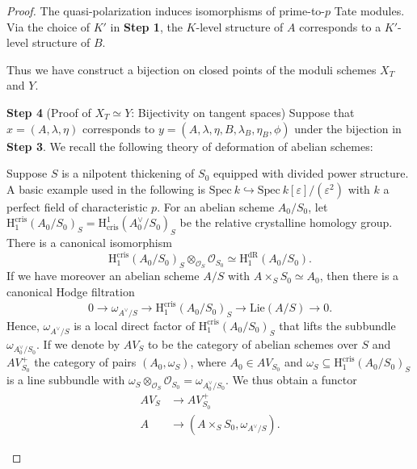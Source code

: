 \documentclass{article}
\begin{document}
\begin{proof}
The quasi-polarization induces isomorphisms of prime-to-$p$ Tate modules. Via the choice of $K'$ in \textbf{Step 1}, the $K$-level structure of $A$ corresponds to a $K'$-level structure of $B$.

Thus we have construct a bijection on closed points of the moduli schemes $X_T$ and $Y$.


\medskip
\noindent\textbf{Step 4} (Proof of $X_T\simeq Y$: Bijectivity on tangent spaces) Suppose that $x=(A,\lambda,\eta)$ corresponds to $y=(A,\lambda,\eta,B,\lambda_B,\eta_B,\phi)$ under the bijection in \textbf{Step 3}. We recall the following theory of deformation of abelian schemes:

Suppose $S$ is a nilpotent thickening of $S_0$ equipped with divided power structure. A basic example used in the following is $\text{Spec}\ k\hookrightarrow \text{Spec}\ k[\varepsilon]/(\varepsilon^2)$ with $k$ a perfect field of characteristic $p$. For an abelian scheme $A_0/S_0$, let $\text{H}^{\text{cris}}_1(A_0/S_0)_S=\text{H}^1_{\text{cris}}(A^\vee_0/S_0)_S$ be the relative crystalline homology group. There is a canonical isomorphism
\begin{equation}
\text{H}_1^{\text{cris}}(A_0/S_0)_S\otimes_{\mathcal{O}_S}\mathcal{O}_{S_0}\simeq \text{H}_1^{\text{dR}}(A_0/S_0).
\end{equation}
If we have moreover an abelian scheme $A/S$ with $A\times_S S_0\simeq A_0$, then there is a canonical Hodge filtration
\begin{equation}
0\longrightarrow \omega_{A^\vee/S}\longrightarrow \text{H}_1^{\text{cris}}(A_0/S_0)_S\longrightarrow \text{Lie}(A/S)\longrightarrow 0.
\end{equation}
Hence, $\omega_{A^\vee/S}$ is a local direct factor of $\text{H}^{\text{cris}}_1(A_0/S_0)_S$ that lifts the subbundle $\omega_{A_0^\vee/S_0}$. If we denote by $AV_S$ to be the category of abelian schemes over $S$ and $AV_{S_0}^+$ the category of pairs $(A_0,\omega_S)$, where $A_0\in AV_{S_0}$ and $\omega_S\subseteq \text{H}_1^{\text{cris}}(A_0/S_0)_S$ is a line subbundle with $\omega_S\otimes_{\mathcal{O}_{S}}\mathcal{O}_{S_0}=\omega_{A_0^\vee/S_0}$. We thus obtain a functor
\begin{equation}
\begin{aligned}
AV_{S}&\longrightarrow AV_{S_0}^+\\
A&\longrightarrow (A\times_S S_0,\omega_{A^\vee/S}).
\end{aligned}
\end{equation}
\begin{theorem}\label{deformation}

\end{theorem}
\end{proof}
\end{document}
